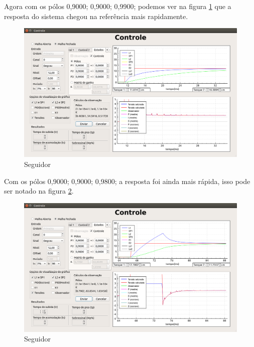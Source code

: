 \documentclass[a4paper,12pt]{article}
\begin{document}
\hspace{4ex}Agora com os pólos 0,9000; 0,9000; 0,9900; podemos ver na figura \ref{img3} que a resposta do sistema chegou na referência mais rapidamente.
\begin{figure}[!h]
\centering
\includegraphics[width=13cm]{FotosSeguidor/Bom}
\caption{Seguidor}
\label{img3}
\end{figure}

\hspace{4ex}Com os pólos 0,9000; 0,9000; 0,9800; a resposta foi ainda mais rápida, isso pode ser notado na figura \ref{img4}.
\begin{figure}[!h]
\centering
\includegraphics[width=13cm]{FotosSeguidor/MuitoBom}
\caption{Seguidor}
\label{img4}
\end{figure}
\end{document}
